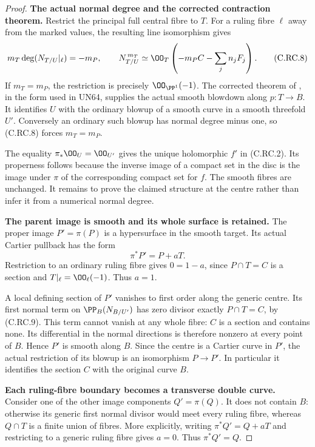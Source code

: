 \begin{proof}
\par\medskip\noindent\textbf{The actual normal degree and the corrected contraction theorem.}
Restrict the principal full central fibre to $T$.
For a ruling fibre $\ell$ away from the marked
values, the resulting line isomorphism gives
\[
       m_T\deg(N_{T/U}|_\ell)=-m_P,\qquad
       N_{T/U}^{\,m_T}
           \simeq\OO_T\left(-m_PC-\sum_jn_jF_j\right).
\tag{C.RC.8}
\]
If $m_T=m_P$, the restriction is precisely
$\OO_{\PP^1}(-1)$. The corrected theorem of
\cite[\S2, Theorem~2' and Proposition~9']{FujikiNakano1971},
in the form used in UN64, supplies the actual
smooth blowdown along $p:T\to B$. It identifies
$U$ with the ordinary blowup of a smooth curve
in a smooth threefold $U'$. Conversely an
ordinary such blowup has normal degree minus
one, so (C.RC.8) forces $m_T=m_P$.

The equality $\pi_*\OO_U=\OO_{U'}$ gives the
unique holomorphic $f'$ in (C.RC.2). Its
properness follows because the inverse image
of a compact set in the disc is the image
under $\pi$ of the corresponding compact
set for $f$. The smooth fibres are unchanged.
It remains to prove the claimed structure
at the centre rather than infer it from a
numerical normal degree.

\par\medskip\noindent\textbf{The parent image is smooth and its whole surface is retained.}
The proper image $P'=\pi(P)$ is a hypersurface
in the smooth target. Its actual Cartier
pullback has the form
\[
                            \pi^*P'=P+aT.
\tag{C.RC.9}
\]
Restriction to an ordinary ruling fibre
gives $0=1-a$, since $P\cap T=C$ is a
section and $T|_\ell=\OO_\ell(-1)$.
Thus $a=1$.

A local defining section of $P'$ vanishes
to first order along the generic centre.
Its first normal term on $\PP_B(N_{B/U'})$
has zero divisor exactly $P\cap T=C$,
by (C.RC.9). This term cannot vanish at
any whole fibre: $C$ is a section and
contains none. Its differential in the
normal directions is therefore nonzero
at every point of $B$. Hence $P'$ is
smooth along $B$. Since the centre is
a Cartier curve in $P'$, the actual
restriction of its blowup is an
isomorphism $P\to P'$. In particular
it identifies the section $C$ with
the original curve $B$.

\par\medskip\noindent\textbf{Each ruling-fibre boundary becomes a transverse double curve.}
Consider one of the other image components
$Q'=\pi(Q)$. It does not contain $B$:
otherwise its generic first normal
divisor would meet every ruling fibre,
whereas $Q\cap T$ is a finite union
of fibres. More explicitly, writing
$\pi^*Q'=Q+aT$ and restricting to a
generic ruling fibre gives $a=0$.
Thus $\pi^*Q'=Q$.


\end{proof}
